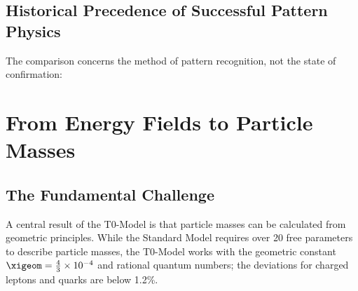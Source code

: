 	\subsection{Historical Precedence of Successful Pattern Physics}
	\label{subsec:historical_precedence}
	
	The comparison concerns the method of pattern recognition, not the state of confirmation:
	
	\begin{table}[H]
		\centering
		\caption{Historical precedence of pattern physics}
		\label{tab:historical_precedence}
	\end{table}
	
	\section{From Energy Fields to Particle Masses}
	\label{sec:energy_fields_to_masses}
	
	\subsection{The Fundamental Challenge}
	\label{subsec:fundamental_challenge}
	
	A central result of the T0-Model is that particle masses can be calculated from geometric principles. While the Standard Model requires over 20 free parameters to describe particle masses, the T0-Model works with the geometric constant $\xigeom = \frac{4}{3} \times 10^{-4}$ and rational quantum numbers; the deviations for charged leptons and quarks are below 1.2\%.
	
